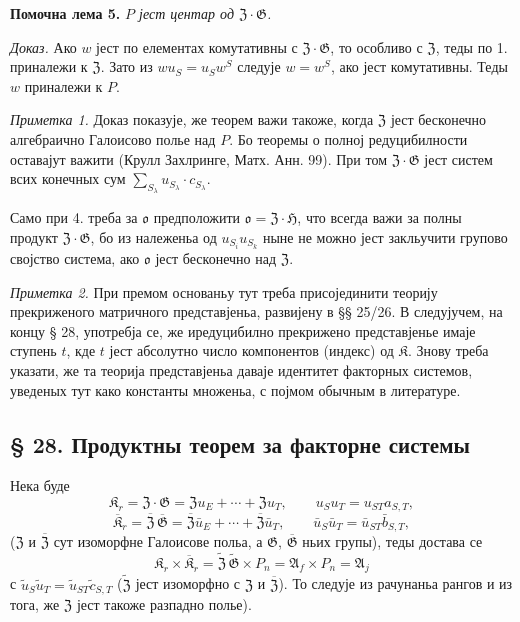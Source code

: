 \documentclass[11pt]{article}
\begin{document}
\noindent\textbf{Помочна лема 5.} \emph{\(P\) јест центар од \(\mathfrak Z\cdot\mathfrak G\).}

\noindent\emph{Доказ.} Ако \(w\) јест по елементах комутативны с \(\mathfrak Z\cdot\mathfrak G\), то особливо с \(\mathfrak Z\), теды по 1. приналежи к \(\mathfrak Z\). Зато из \(wu_S=u_Sw^S\) следује \(w=w^S\), ако јест комутативны. Теды \(w\) приналежи к \(P\).

\noindent\emph{Приметка 1.} Доказ показује, же теорем важи такоже, когда \(\mathfrak Z\) јест бесконечно алгебраично Галоисово полье над \(P\). Бо теоремы о полној редуцибилности оставајут важити (Крулл Захлринге, Матх. Анн. 99). При том \(\mathfrak Z\cdot\mathfrak G\) јест систем всих конечных сум \(\sum_{S_\lambda}u_{S_\lambda}\cdot c_{S_\lambda}\).

Само при 4. треба за \(\mathfrak o\) предположити \(\mathfrak o=\mathfrak Z\cdot\mathfrak H\), что всегда важи за полны продукт \(\mathfrak Z\cdot\mathfrak G\), бо из належеньа од \(u_{S_i}u_{S_k}\) ныне не можно јест закльучити групово својство система, ако \(\mathfrak o\) јест бесконечно над \(\mathfrak Z\).

\noindent\emph{Приметка 2.} При премом основаньу тут треба присојединити теорију прекриженого матричного представјеньа, развијену в §§ 25/26. В следујучем, на концу § 28, употребја се, же иредуцибилно прекрижено представјенье имаје ступень \(t\), кде \(t\) јест абсолутно число компонентов (индекс) од \(\mathfrak K\). Знову треба указати, же та теорија представјеньа даваје идентитет факторных системов, уведеных тут како константы множеньа, с појмом обычным в литературе.

\subsection*{§ 28. Продуктны теорем за факторне системы}\label{produktsatz-fuer-faktorensysteme}

Нека буде
\[
\mathfrak K_r=\mathfrak Z\cdot\mathfrak G
=\mathfrak Zu_E+\cdots+\mathfrak Zu_T,
\qquad u_Su_T=u_{ST}a_{S,T},
\]
\[
\overline{\mathfrak K}_r
=\overline{\mathfrak Z}\,\overline{\mathfrak G}
=\overline{\mathfrak Z}\bar u_E+\cdots+\overline{\mathfrak Z}\bar u_T,
\qquad
\bar u_S\bar u_T=\bar u_{ST}\bar b_{S,T},
\]
(\(\mathfrak Z\) и \(\overline{\mathfrak Z}\) сут изоморфне Галоисове польа, а \(\mathfrak G\), \(\overline{\mathfrak G}\) ньих групы), теды достава се
\[
\mathfrak K_r\times\overline{\mathfrak K}_r
=\widetilde{\mathfrak Z}\,\widetilde{\mathfrak G}\times P_n
=\mathfrak A_f\times P_n
=\mathfrak A_j
\]
с \(\tilde u_S\tilde u_T=\tilde u_{ST}\tilde c_{S,T}\) (\(\widetilde{\mathfrak Z}\) јест изоморфно с \(\mathfrak Z\) и \(\overline{\mathfrak Z}\)). То следује из рачунаньа рангов и из тога, же \(\mathfrak Z\) јест такоже разпадно полье).
\end{document}
